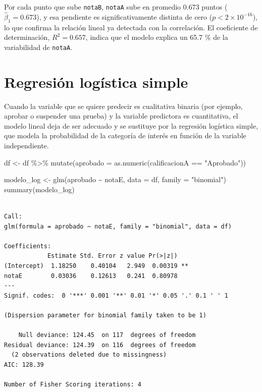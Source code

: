 \documentclass[
  spanish,
  a4paper,
]{scrreport}
\newenvironment{Shaded}{\begin{snugshade}}{\end{snugshade}}
\newcommand{\AttributeTok}[1]{\textcolor[rgb]{0.40,0.45,0.13}{#1}}
\newcommand{\FunctionTok}[1]{\textcolor[rgb]{0.28,0.35,0.67}{#1}}
\newcommand{\NormalTok}[1]{\textcolor[rgb]{0.00,0.23,0.31}{#1}}
\newcommand{\OtherTok}[1]{\textcolor[rgb]{0.00,0.23,0.31}{#1}}
\newcommand{\SpecialCharTok}[1]{\textcolor[rgb]{0.37,0.37,0.37}{#1}}
\newcommand{\StringTok}[1]{\textcolor[rgb]{0.13,0.47,0.30}{#1}}
\theoremstyle{definition}
\theoremstyle{definition}
\theoremstyle{remark}
\begin{document}
Por cada punto que sube \texttt{notaB}, \texttt{notaA} sube en promedio
0.673 puntos (\(\hat\beta_1 = 0.673\)), y esa pendiente es
significativamente distinta de cero (\(p < 2\times10^{-16}\)), lo que
confirma la relación lineal ya detectada con la correlación. El
coeficiente de determinación, \(R^2 = 0.657\), indica que el modelo
explica un 65.7 \% de la variabilidad de \texttt{notaA}.

\section{Regresión logística
simple}\label{regresiuxf3n-loguxedstica-simple}

Cuando la variable que se quiere predecir es cualitativa binaria (por
ejemplo, aprobar o suspender una prueba) y la variable predictora es
cuantitativa, el modelo lineal deja de ser adecuado y se sustituye por
la regresión logística simple, que modela la probabilidad de la
categoría de interés en función de la variable independiente.

\begin{Shaded}
\begin{Highlighting}[]
\NormalTok{df }\OtherTok{\textless{}{-}}\NormalTok{ df }\SpecialCharTok{\%\textgreater{}\%}
  \FunctionTok{mutate}\NormalTok{(}\AttributeTok{aprobado =} \FunctionTok{as.numeric}\NormalTok{(calificacionA }\SpecialCharTok{==} \StringTok{"Aprobado"}\NormalTok{))}

\NormalTok{modelo\_log }\OtherTok{\textless{}{-}} \FunctionTok{glm}\NormalTok{(aprobado }\SpecialCharTok{\textasciitilde{}}\NormalTok{ notaE, }\AttributeTok{data =}\NormalTok{ df, }\AttributeTok{family =} \StringTok{"binomial"}\NormalTok{)}
\FunctionTok{summary}\NormalTok{(modelo\_log)}
\end{Highlighting}
\end{Shaded}

\begin{verbatim}

Call:
glm(formula = aprobado ~ notaE, family = "binomial", data = df)

Coefficients:
            Estimate Std. Error z value Pr(>|z|)   
(Intercept)  1.18250    0.40104   2.949  0.00319 **
notaE        0.03036    0.12613   0.241  0.80978   
---
Signif. codes:  0 '***' 0.001 '**' 0.01 '*' 0.05 '.' 0.1 ' ' 1

(Dispersion parameter for binomial family taken to be 1)

    Null deviance: 124.45  on 117  degrees of freedom
Residual deviance: 124.39  on 116  degrees of freedom
  (2 observations deleted due to missingness)
AIC: 128.39

Number of Fisher Scoring iterations: 4
\end{verbatim}
\end{document}
